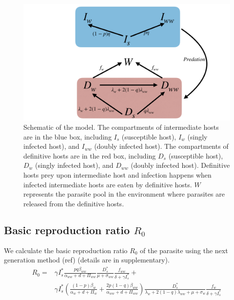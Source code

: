 \documentclass[11pt]{article}
\begin{document}
\begin{figure}[ht!]
\includegraphics[width=\textwidth]{Figures/schematics.pdf}
\caption{Schematic of the model. The compartments of intermediate hosts are in the blue box, including $I_s$ (susceptible host), $I_w$ (singly infected host), and $I_{ww}$ (doubly infected host). The compartments of definitive hosts are in the red box, including $D_s$ (susceptible host), $D_w$ (singly infected host), and $D_{ww}$ (doubly infected host). Definitive hosts prey upon intermediate host and infection happens when infected intermediate hosts are eaten by definitive hosts. $W$ represents the parasite pool in the environment where parasites are released from the definitive hosts.}
\label{fig:schematic}
\end{figure}

\subsection*{Basic reproduction ratio $R_0$}

We calculate the basic reproduction ratio $R_0$ of the parasite using the next generation method (ref) (details are in supplementary).
\begin{align}
R_0 = & \gamma I_s^* \frac{ p q \beta_{ww}}{\alpha_{ww} + d + \Pi_{ww}} \frac{D_s^*}{\mu +\sigma_{ww}} \frac{f_{ww}}{\delta +\gamma I_s^*} + \nonumber \\
& \gamma  I_s^* \left( \frac{ (1-p)\beta_w}{\alpha_w + d + \Pi_w} + \frac{2 p (1-q) \beta_{ww}}{\alpha_{ww} + d + \Pi_{ww}} \right) \frac{D_s^*}{\lambda_w + 2 (1-q) \lambda_{ww}  + \mu + \sigma_w} \frac{f_w}{\delta +\gamma  I_s^*}
\end{align}
\end{document}
